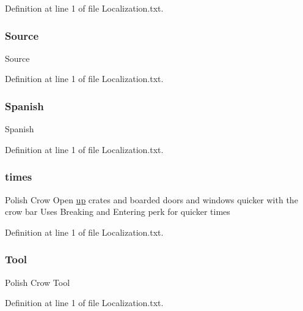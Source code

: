 Definition at line 1 of file Localization.\+txt.

\mbox{\label{_sphere_i_i_01_take_01_and_01_replace_2_config_2_localization_8txt_a176e1eca2d1e3d1c6a064340bc6a351e}} 
\subsubsection{\texorpdfstring{Source}{Source}}
{\footnotesize\ttfamily Source}



Definition at line 1 of file Localization.\+txt.

\mbox{\label{_sphere_i_i_01_take_01_and_01_replace_2_config_2_localization_8txt_a1a2fba2f516cad50ef94b146902a8336}} 
\subsubsection{\texorpdfstring{Spanish}{Spanish}}
{\footnotesize\ttfamily Spanish}



Definition at line 1 of file Localization.\+txt.

\mbox{\label{_sphere_i_i_01_take_01_and_01_replace_2_config_2_localization_8txt_ad4fbe14714761ba0a1acc7ff36fdbdc5}} 
\subsubsection{\texorpdfstring{times}{times}}
{\footnotesize\ttfamily Polish Crow Open \mbox{\hyperlink{_the_01_restless_01_curse_2_config_2_localization_01-_01_quest_8txt_a2f8d5a9cc6c08e259de10d34d28f85c4}{up}} crates and boarded doors and windows quicker with the crow bar Uses Breaking and Entering perk for quicker times}



Definition at line 1 of file Localization.\+txt.

\mbox{\label{_sphere_i_i_01_take_01_and_01_replace_2_config_2_localization_8txt_ae508515843f62862918c6a9f71ffd5db}} 
\subsubsection{\texorpdfstring{Tool}{Tool}}
{\footnotesize\ttfamily Polish Crow Tool}



Definition at line 1 of file Localization.\+txt.

